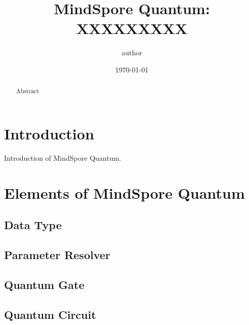 \documentclass[pra,twocolumn,superscriptaddress,floatfix,nofootinbib,amsmath,amssymb]{revtex4-1}
\begin{document}
\title{MindSpore Quantum: XXXXXXXXX
}



\author{author}


\date{\today}



\begin{abstract}
    Abstract
\end{abstract}
\maketitle
\tableofcontents

\section{Introduction}
Introduction of MindSpore Quantum.


\section{Elements of MindSpore Quantum}

\subsection{Data Type}


\subsection{Parameter Resolver}


\subsection{Quantum Gate}


\subsection{Quantum Circuit}


% 
\end{document}
